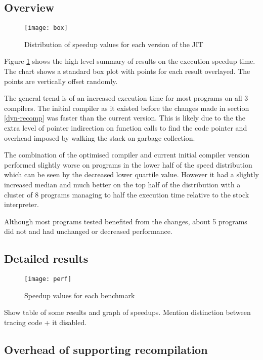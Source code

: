 \subsection{Overview}

\begin{figure}[h]
      \texttt{[image: box]}
      \caption{Distribution of speedup values for each version of the JIT}
      \label{fig:box}
\end{figure}

Figure \ref{fig:box} shows the high level summary of results on the execution speedup time. The
chart shows a standard box plot with points for each result overlayed. The points are vertically
offset randomly.

The general trend is of an increased execution time for most programs on all 3 compilers. The
initial compiler as it existed before the changes made in section \ref{dyn-recomp} was faster than
the current version. This is likely due to the the extra level of pointer indirection on function
calls to find the code pointer and overhead imposed by walking the stack on garbage collection.

The combination of the optimised compiler and current initial compiler version performed slightly
worse on programs in the lower half of the speed distribution  which can be seen by the decreased
lower quartile value.  However it had a slightly increased median and much better on the top half
of the distribution with a cluster of 8 programs managing to half the execution time relative to
the stock interpreter.

Although most programs tested benefited from the changes, about 5 programs did not and had
unchanged or decreased performance.

\subsection{Detailed results}

\begin{landscape}
      \begin{figure}[h]
            \texttt{[image: perf]}
            \caption{Speedup values for each benchmark}
            \label{fig:perf}
      \end{figure}
\end{landscape}

Show table of some results and graph of speedups. Mention distinction between tracing code + it
disabled.

\subsection{Overhead of supporting recompilation}

